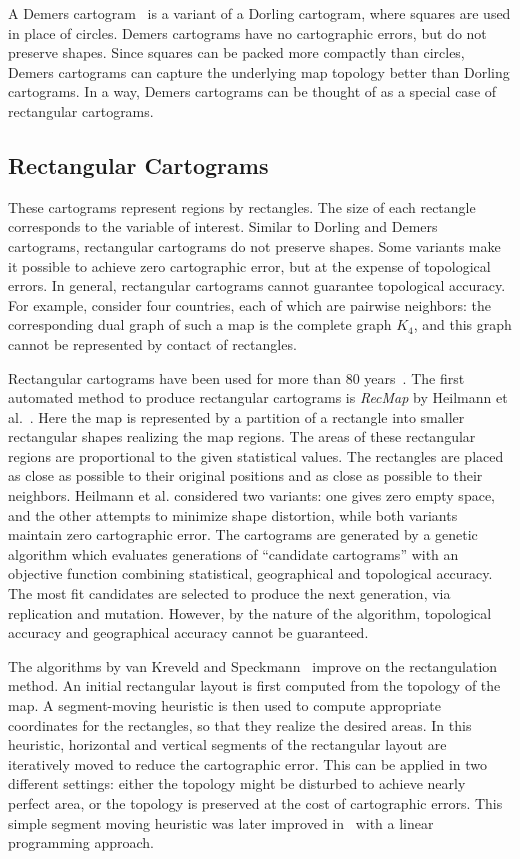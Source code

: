 \documentclass{egpubl}
\begin{document}
A Demers cartogram~\cite{Demers} is a variant of a Dorling cartogram, where squares are used in place of circles.  Demers cartograms have no cartographic errors, but do not preserve shapes. Since squares can be packed more compactly than circles, Demers cartograms can capture the underlying map topology better than Dorling cartograms. In a way, Demers cartograms can be thought of as a special case of rectangular cartograms.


\subsection{Rectangular Cartograms}
These cartograms represent regions by rectangles. The size of each rectangle corresponds to the variable of interest. Similar to Dorling and Demers cartograms, rectangular cartograms do not preserve shapes. Some variants make it possible to achieve zero cartographic error, but at the expense of topological errors. In general, rectangular cartograms cannot guarantee topological accuracy. For example, consider four countries, each of which are pairwise neighbors: the corresponding dual graph of such a map is the complete graph $K_4$, and this graph cannot be represented by contact of rectangles. 


Rectangular cartograms have been used for more than 80 years~\cite{Raisz34}. 
The first automated method to produce rectangular cartograms is
 \textit{RecMap} by Heilmann et al.~\cite{hkps04}. Here the map is represented by a partition of a rectangle into smaller rectangular shapes realizing the map regions. The areas of these rectangular regions are proportional to the given statistical values. The rectangles are placed as close as possible to their original positions and as close as possible to their neighbors. Heilmann et al. considered two variants: one gives zero empty space, and the other attempts to minimize shape distortion, while both variants maintain zero cartographic error. 
The cartograms are generated by a genetic algorithm which evaluates generations of ``candidate cartograms'' with an objective function combining statistical, geographical and topological accuracy. The most fit candidates are selected to produce the next generation, via replication and mutation. However, by the nature of the algorithm, topological accuracy and geographical accuracy cannot be guaranteed.
 


The algorithms by van Kreveld and Speckmann~\cite{KS05,ks07} improve on the rectangulation method. An initial rectangular layout is first computed from the topology of the map. A segment-moving heuristic is then used to compute appropriate coordinates for the rectangles, so that they realize the desired areas. In this heuristic, horizontal and vertical segments of the rectangular layout are iteratively moved to reduce the cartographic error. This can be applied in two different settings: either the topology might be disturbed to achieve nearly perfect area, or the topology is preserved at the cost of cartographic errors. This simple segment moving heuristic was later improved in~\cite{SKF06} with a linear programming approach.
\end{document}
